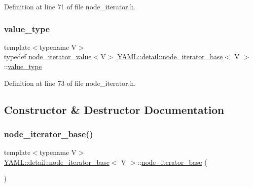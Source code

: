 Definition at line 71 of file node\+\_\+iterator.\+h.

\mbox{\label{class_y_a_m_l_1_1detail_1_1node__iterator__base_ac091253ed737c52668c9f9d84bdfd777}} 
\subsubsection{\texorpdfstring{value\_type}{value\_type}}
{\footnotesize\ttfamily template$<$typename V$>$ \\
typedef \mbox{\hyperlink{struct_y_a_m_l_1_1detail_1_1node__iterator__value}{node\+\_\+iterator\+\_\+value}}$<$V$>$ \mbox{\hyperlink{class_y_a_m_l_1_1detail_1_1node__iterator__base}{Y\+A\+M\+L\+::detail\+::node\+\_\+iterator\+\_\+base}}$<$ V $>$\+::\mbox{\hyperlink{class_y_a_m_l_1_1detail_1_1node__iterator__base_ac091253ed737c52668c9f9d84bdfd777}{value\+\_\+type}}}



Definition at line 73 of file node\+\_\+iterator.\+h.



\subsection{Constructor \& Destructor Documentation}
\mbox{\label{class_y_a_m_l_1_1detail_1_1node__iterator__base_a97f427510ecc4ca463d74d8b0df6a5d8}} 
\subsubsection{\texorpdfstring{node\_iterator\_base()}{node\_iterator\_base()}\hspace{0.1cm}{\footnotesize\ttfamily [1/4]}}
{\footnotesize\ttfamily template$<$typename V$>$ \\
\mbox{\hyperlink{class_y_a_m_l_1_1detail_1_1node__iterator__base}{Y\+A\+M\+L\+::detail\+::node\+\_\+iterator\+\_\+base}}$<$ V $>$\+::\mbox{\hyperlink{class_y_a_m_l_1_1detail_1_1node__iterator__base}{node\+\_\+iterator\+\_\+base}} (\begin{DoxyParamCaption}{ }\end{DoxyParamCaption})\hspace{0.3cm}{\ttfamily [inline]}}



